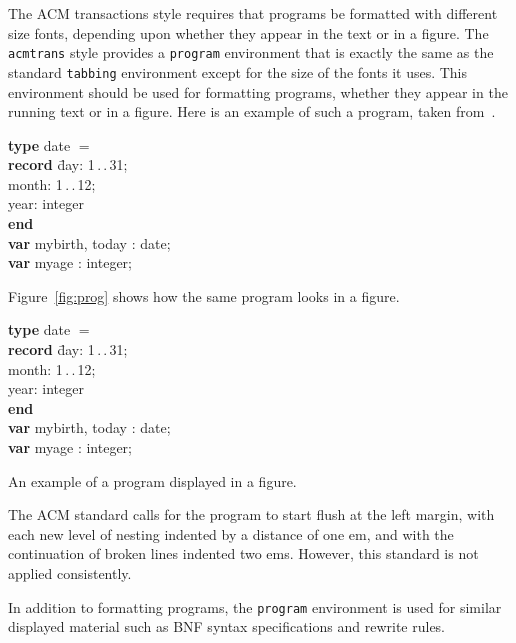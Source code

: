 The ACM transactions style requires that programs be formatted with
different size fonts, depending upon whether they appear in the text or
in a figure.  The {\tt acmtrans} style provides a {\tt program}
environment that is exactly the same as the standard {\tt tabbing}
environment except for the size of the fonts it uses.  This environment
should be used for formatting programs, whether they appear in the
running text or in a figure.  Here is an example of such a program,
taken from~\cite{7(2):183}.
\begin{program}
{\bf type} date $=$\\
\hspace*{1em}\= {\bf record} \= day: 1\,.\,.\,31;\+\+\\
                                month: 1\,.\,.\,12;\\
                                year: integer \-\\
                {\bf end} \-\\
{\bf var} mybirth, today : date;\\
{\bf var} myage : integer;
\end{program}
Figure~\ref{fig:prog} shows how the same program looks in a figure.
\begin{narrowfig}{104pt}
\begin{program}
{\bf type} date $=$\\
\hspace*{1em}\= {\bf record} \= day: 1\,.\,.\,31;\+\+\\
                                month: 1\,.\,.\,12;\\
                                year: integer \-\\
                {\bf end} \-\\
{\bf var} mybirth, today : date;\\
{\bf var} myage : integer;
\end{program}
\caption{An example of a program displayed in a figure.}
\label{fig:prog}
\end{narrowfig}


The ACM standard calls for the program to start flush at the left
margin, with each new level of nesting indented by a distance of one
em, and with the continuation of broken lines indented two ems.  However,
this standard is not applied consistently.

In addition to formatting programs, the {\tt program} environment is
used for similar displayed material such as BNF syntax specifications
and rewrite rules.


